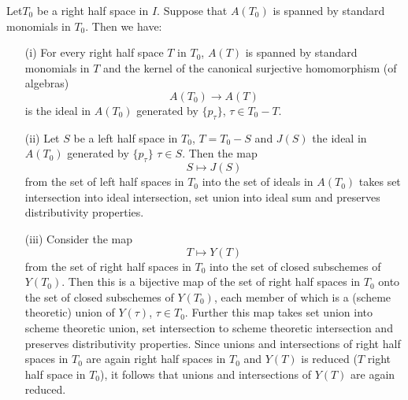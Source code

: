 \begin{prop}\label{art18-prop2}
Let\pageoriginale $T_0$ be a right half space in $I$. Suppose that $A(T_0)$ is spanned by standard monomials in $T_0$. Then we have:
\begin{itemize}
\item[\rm (i)] For every right half space $T$ in $T_0$, $A(T)$ is spanned by standard monomials in $T$ and the kernel of the canonical surjective homomorphism (of algebras)
$$
A(T_0) \to A (T)
$$
is the ideal in $A(T_0)$ generated by $\{p_\tau\}$, $\tau \in T_0 - T$.

\item[\rm (ii)] Let $S$ be a left half space in $T_0$, $T = T_0 - S$ and $J(S)$ the ideal in $A(T_0)$ generated by $\{p_\tau\}$ $\tau \in S$. Then the map
$$
S \mapsto J(S)
$$
from the set of left half spaces in $T_0$ into the set of ideals in $A(T_0)$ takes set intersection into ideal intersection, set union into ideal sum and  preserves distributivity properties.

\item[\rm (iii)] Consider the map
$$
T \mapsto Y (T)
$$
from the set of right half spaces in $T_0$ into the set of closed subschemes of $Y(T_0)$. Then this is a bijective map of the set of right half spaces in $T_0$ onto the set of closed subschemes of $Y(T_0)$, each member of which is a (scheme theoretic) union of $Y(\tau)$, $\tau \in T_0$. Further this map takes set union into scheme theoretic union, set intersection to scheme theoretic intersection and preserves distributivity properties. Since unions and intersections of right half spaces in $T_0$ are again right half spaces in $T_0$ and $Y(T)$ is reduced ($T$ right half space in $T_0$), it follows that unions and intersections of $Y(T)$ are again reduced.
\end{itemize}
\end{prop}

